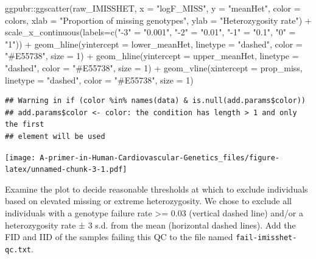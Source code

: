 \documentclass[
]{book}
\newenvironment{Shaded}{\begin{snugshade}}{\end{snugshade}}
\newcommand{\AttributeTok}[1]{\textcolor[rgb]{0.77,0.63,0.00}{#1}}
\newcommand{\DecValTok}[1]{\textcolor[rgb]{0.00,0.00,0.81}{#1}}
\newcommand{\FunctionTok}[1]{\textcolor[rgb]{0.00,0.00,0.00}{#1}}
\newcommand{\NormalTok}[1]{#1}
\newcommand{\OtherTok}[1]{\textcolor[rgb]{0.56,0.35,0.01}{#1}}
\newcommand{\SpecialCharTok}[1]{\textcolor[rgb]{0.00,0.00,0.00}{#1}}
\newcommand{\StringTok}[1]{\textcolor[rgb]{0.31,0.60,0.02}{#1}}
\begin{document}
\begin{Shaded}
\begin{Highlighting}[]
\NormalTok{ggpubr}\SpecialCharTok{::}\FunctionTok{ggscatter}\NormalTok{(raw\_IMISSHET, }\AttributeTok{x =} \StringTok{"logF\_MISS"}\NormalTok{, }\AttributeTok{y =} \StringTok{"meanHet"}\NormalTok{,}
                  \AttributeTok{color =}\NormalTok{ colors,}
                  \AttributeTok{xlab =} \StringTok{"Proportion of missing genotypes"}\NormalTok{, }\AttributeTok{ylab =} \StringTok{"Heterozygosity rate"}\NormalTok{) }\SpecialCharTok{+}
  \FunctionTok{scale\_x\_continuous}\NormalTok{(}\AttributeTok{labels=}\FunctionTok{c}\NormalTok{(}\StringTok{"{-}3"} \OtherTok{=} \StringTok{"0.001"}\NormalTok{, }\StringTok{"{-}2"} \OtherTok{=} \StringTok{"0.01"}\NormalTok{,}
                              \StringTok{"{-}1"} \OtherTok{=} \StringTok{"0.1"}\NormalTok{, }\StringTok{"0"} \OtherTok{=} \StringTok{"1"}\NormalTok{)) }\SpecialCharTok{+}
  \FunctionTok{geom\_hline}\NormalTok{(}\AttributeTok{yintercept =}\NormalTok{ lower\_meanHet, }\AttributeTok{linetype =} \StringTok{"dashed"}\NormalTok{,}
                \AttributeTok{color =} \StringTok{"\#E55738"}\NormalTok{, }\AttributeTok{size =} \DecValTok{1}\NormalTok{) }\SpecialCharTok{+}
  \FunctionTok{geom\_hline}\NormalTok{(}\AttributeTok{yintercept =}\NormalTok{ upper\_meanHet, }\AttributeTok{linetype =} \StringTok{"dashed"}\NormalTok{,}
                \AttributeTok{color =} \StringTok{"\#E55738"}\NormalTok{, }\AttributeTok{size =} \DecValTok{1}\NormalTok{) }\SpecialCharTok{+}
  \FunctionTok{geom\_vline}\NormalTok{(}\AttributeTok{xintercept =}\NormalTok{ prop\_miss, }\AttributeTok{linetype =} \StringTok{"dashed"}\NormalTok{,}
                \AttributeTok{color =} \StringTok{"\#E55738"}\NormalTok{, }\AttributeTok{size =} \DecValTok{1}\NormalTok{)}
\end{Highlighting}
\end{Shaded}

\begin{verbatim}
## Warning in if (color %in% names(data) & is.null(add.params$color))
## add.params$color <- color: the condition has length > 1 and only the first
## element will be used
\end{verbatim}

\texttt{[image: A-primer-in-Human-Cardiovascular-Genetics\_files/figure-latex/unnamed-chunk-3-1.pdf]}

Examine the plot to decide reasonable thresholds at which to exclude individuals based on elevated missing or extreme heterozygosity. We chose to exclude all individuals with a genotype failure rate \textgreater= 0.03 (vertical dashed line) and/or a heterozygosity rate ± 3 s.d. from the mean (horizontal dashed lines). Add the FID and IID of the samples failing this QC to the file named \texttt{fail-imisshet-qc.txt}.
\end{document}
